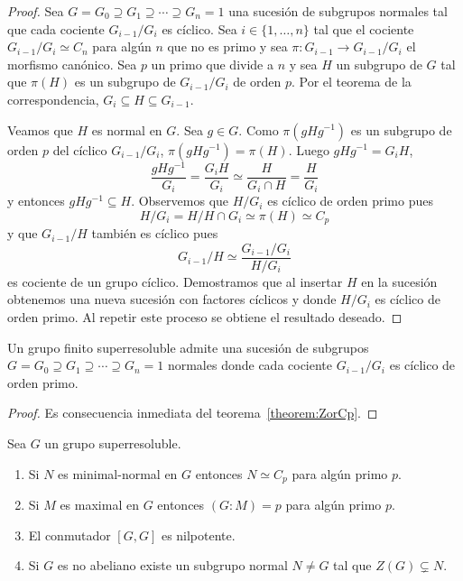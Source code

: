 \begin{proof}
	Sea $G=G_0\supseteq G_1\supseteq\cdots\supseteq G_n=1$ una sucesión de
	subgrupos normales tal que cada cociente $G_{i-1}/G_i$ es cíclico. Sea
	$i\in\{1,\dots,n\}$ tal que el cociente $G_{i-1}/G_i\simeq C_n$ para algún
	$n$ que no es primo y sea $\pi\colon G_{i-1}\to G_{i-1}/G_i$ el morfismo
	canónico.  Sea $p$ un primo que divide a $n$ y sea $H$ un subgrupo de $G$
	tal que $\pi(H)$ es un subgrupo de $G_{i-1}/G_i$ de orden $p$. Por el
	teorema de la correspondencia, $G_{i}\subseteq H\subseteq G_{i-1}$. 
	
	Veamos que $H$ es normal en $G$. Sea $g\in G$. Como $\pi(gHg^{-1})$ es un
	subgrupo de orden $p$ del cíclico $G_{i-1}/G_i$, $\pi(gHg^{-1})=\pi(H)$. Luego
	$gHg^{-1}=G_{i}H$,
	\[
	\frac{gHg^{-1}}{G_i}=\frac{G_{i}H}{G_{i}}\simeq \frac{H}{G_i\cap H}=\frac{H}{G_i}
	\]
	y entonces $gHg^{-1}\subseteq H$.  Observemos que $H/G_i$ es cíclico de orden
	primo pues 
	\[
		H/G_i=H/H\cap G_i\simeq \pi(H)\simeq C_p
	\]
	y que $G_{i-1}/H$ también es cíclico pues 
	\[
	G_{i-1}/H\simeq\frac{G_{i-1}/G_i}{H/G_i}
	\]
	es cociente de un grupo cíclico. Demostramos que al insertar $H$ en la
	sucesión obtenemos una nueva sucesión con factores cíclicos y donde
	$H/G_{i}$ es cíclico de orden primo. Al repetir este proceso se obtiene el
	resultado deseado.
\end{proof}

\begin{corollary}
	Un grupo finito superresoluble admite una sucesión de subgrupos 
	$G=G_0\supseteq G_1\supseteq\cdots\supseteq G_n=1$ 
	normales donde cada cociente $G_{i-1}/G_i$ es cíclico de orden primo.
\end{corollary}

\begin{proof}
	Es consecuencia inmediata del teorema~\ref{theorem:ZorCp}.
\end{proof}

\begin{theorem}
	\label{theorem:super_structure}
	Sea $G$ un grupo superresoluble. 
	\begin{enumerate}
		\item Si $N$ es minimal-normal en $G$ entonces $N\simeq C_p$ para algún primo $p$.
		\item Si $M$ es maximal en $G$ entonces $(G:M)=p$ para algún primo $p$.
		\item El conmutador $[G,G]$ es nilpotente.
		\item Si $G$ es no abeliano existe un subgrupo normal $N\ne G$ tal que
			$Z(G)\subsetneq N$.
	\end{enumerate}
\end{theorem}

